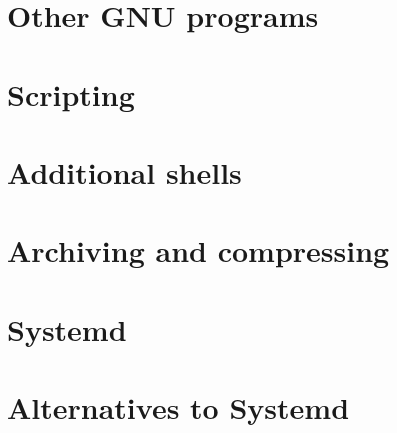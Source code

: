 \documentclass[oneside]{book}
\begin{document}
\part{Other GNU programs}






\part{Scripting}


\part{Additional shells}





\part{Archiving and compressing}




\part{Systemd}


\part{Alternatives to Systemd}

\end{document}
